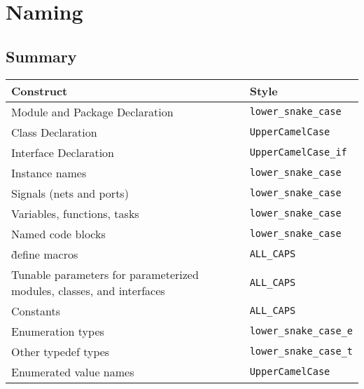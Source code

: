 \chapter{Naming}
\label{naming}

  \section{Summary}
  \label{naming:summary}

    \begin{tabular}{|l|l|}
      \hline
      \rowcolor{gray!50}
      \textbf{Construct} & \textbf{Style} \\
      \hline
      Module and Package Declaration                                        & \texttt{lower\_snake\_case} \\ \rowcolor{gray!20}
      Class Declaration                                                     & \texttt{UpperCamelCase} \\
      Interface Declaration                                                 & \texttt{UpperCamelCase\_if} \\ \rowcolor{gray!20}
      Instance names                                                        & \texttt{lower\_snake\_case} \\
      Signals (nets and ports)                                              & \texttt{lower\_snake\_case} \\ \rowcolor{gray!20}
      Variables, functions, tasks                                           & \texttt{lower\_snake\_case} \\
      Named code blocks                                                     & \texttt{lower\_snake\_case} \\ \rowcolor{gray!20}
      \`define macros                                                       & \texttt{ALL\_CAPS} \\
      Tunable parameters for parameterized modules, classes, and interfaces & \texttt{ALL\_CAPS} \\ \rowcolor{gray!20}
      Constants                                                             & \texttt{ALL\_CAPS} \\
      Enumeration types                                                     & \texttt{lower\_snake\_case\_e} \\ \rowcolor{gray!20}
      Other typedef types                                                   & \texttt{lower\_snake\_case\_t} \\
      Enumerated value names                                                & \texttt{UpperCamelCase} \\
      \hline
    \end{tabular}

